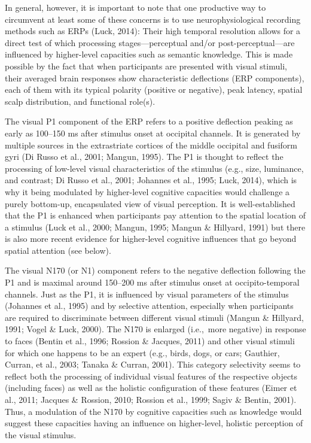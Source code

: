 \documentclass[
  english,
  man,floatsintext]{apa7}
\begin{document}
In general, however, it is important to note that one productive way to circumvent at least some of these concerns is to use neurophysiological recording methods such as ERPs (Luck, 2014): Their high temporal resolution allows for a direct test of which processing stages---perceptual and/or post-perceptual---are influenced by higher-level capacities such as semantic knowledge. This is made possible by the fact that when participants are presented with visual stimuli, their averaged brain responses show characteristic deflections (ERP components), each of them with its typical polarity (positive or negative), peak latency, spatial scalp distribution, and functional role(s).

The visual P1 component of the ERP refers to a positive deflection peaking as early as 100--150 ms after stimulus onset at occipital channels. It is generated by multiple sources in the extrastriate cortices of the middle occipital and fusiform gyri (Di Russo et al., 2001; Mangun, 1995). The P1 is thought to reflect the processing of low-level visual characteristics of the stimulus (e.g., size, luminance, and contrast; Di Russo et al., 2001; Johannes et al., 1995; Luck, 2014), which is why it being modulated by higher-level cognitive capacities would challenge a purely bottom-up, encapsulated view of visual perception. It is well-established that the P1 is enhanced when participants pay attention to the spatial location of a stimulus (Luck et al., 2000; Mangun, 1995; Mangun \& Hillyard, 1991) but there is also more recent evidence for higher-level cognitive influences that go beyond spatial attention (see below).

The visual N170 (or N1) component refers to the negative deflection following the P1 and is maximal around 150--200 ms after stimulus onset at occipito-temporal channels. Just as the P1, it is influenced by visual parameters of the stimulus (Johannes et al., 1995) and by selective attention, especially when participants are required to discriminate between different visual stimuli (Mangun \& Hillyard, 1991; Vogel \& Luck, 2000). The N170 is enlarged (i.e.,~more negative) in response to faces (Bentin et al., 1996; Rossion \& Jacques, 2011) and other visual stimuli for which one happens to be an expert (e.g., birds, dogs, or cars; Gauthier, Curran, et al., 2003; Tanaka \& Curran, 2001). This category selectivity seems to reflect both the processing of individual visual features of the respective objects (including faces) as well as the holistic configuration of these features (Eimer et al., 2011; Jacques \& Rossion, 2010; Rossion et al., 1999; Sagiv \& Bentin, 2001). Thus, a modulation of the N170 by cognitive capacities such as knowledge would suggest these capacities having an influence on higher-level, holistic perception of the visual stimulus.
\end{document}
